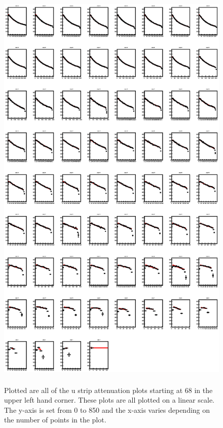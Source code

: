 \begin{figure}[h]
    \centering
    \includegraphics[width= 6.5in, height = 8in, keepaspectratio = true]{allustrips}
    \caption{Plotted are all of the u strip attenuation plots starting at 68 in the upper left hand corner. 
    These plots are all plotted on a linear scale. The y-axis is set from 0 to 850 and the x-axis varies 
    depending on the number of points in the plot.}
    \label{fig:allustrips}
\end{figure}

